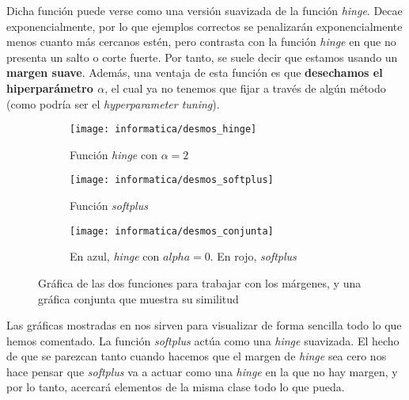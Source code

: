 Dicha función puede verse como una versión suavizada de la función \textit{hinge}. Decae exponencialmente, por lo que ejemplos correctos se penalizarán exponencialmente menos cuanto más cercanos estén, pero contrasta con la función \textit{hinge} en que no presenta un salto o corte fuerte. Por tanto, se suele decir que estamos usando un \textbf{margen suave}. Además, una ventaja de esta función es que \textbf{desechamos el hiperparámetro $\alpha$}, el cual ya no tenemos que fijar a través de algún método (como podría ser el \textit{hyperparameter tuning}).

\begin{figure}[H]
\centering
    \begin{subfigure}{.5\textwidth}
        \centering
        \texttt{[image: informatica/desmos\_hinge]}
        \caption{Función \textit{hinge} con $\alpha = 2$}
    \end{subfigure}%
    \begin{subfigure}{.5\textwidth}
        \centering
        \texttt{[image: informatica/desmos\_softplus]}
        \caption{Función \textit{softplus}}
    \end{subfigure}

    \begin{subfigure}{.5\textwidth}
        \centering
        \texttt{[image: informatica/desmos\_conjunta]}
        \caption{En azul, \textit{hinge} con $alpha = 0$. En rojo, \textit{softplus}}
    \end{subfigure}


\caption{Gráfica de las dos funciones para trabajar con los márgenes, y una gráfica conjunta que muestra su similitud}
    \label{img:graficas_margenes}
\end{figure}

Las gráficas mostradas en  nos sirven para visualizar de forma sencilla todo lo que hemos comentado. La función \textit{softplus} actúa como una \textit{hinge} suavizada. El hecho de que se parezcan tanto cuando hacemos que el margen de \textit{hinge} sea cero nos hace pensar que \textit{softplus} va a actuar como una \textit{hinge} en la que no hay margen, y por lo tanto, acercará elementos de la misma clase todo lo que pueda.
